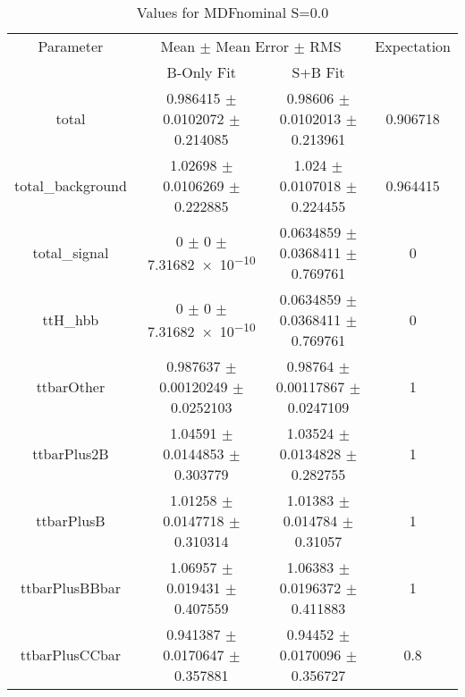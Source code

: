 \begin{table}
\centering
\caption{Values for MDFnominal S=0.0}
\begin{tabular}{cccc}
\toprule
Parameter & \multicolumn{2}{c}{Mean $\pm$ Mean Error $\pm$ RMS} & Expectation\\
 & B-Only Fit & S+B Fit & \\
\midrule
total & \num{0.986415} $\pm$ \num{0.0102072} $\pm$ \num{0.214085} & \num{0.98606} $\pm$ \num{0.0102013} $\pm$ \num{0.213961} & \num{0.906718}\\
total\_background & \num{1.02698} $\pm$ \num{0.0106269} $\pm$ \num{0.222885} & \num{1.024} $\pm$ \num{0.0107018} $\pm$ \num{0.224455} & \num{0.964415}\\
total\_signal & \num{0} $\pm$ \num{0} $\pm$ \num{7.31682e-10} & \num{0.0634859} $\pm$ \num{0.0368411} $\pm$ \num{0.769761} & \num{0}\\
ttH\_hbb & \num{0} $\pm$ \num{0} $\pm$ \num{7.31682e-10} & \num{0.0634859} $\pm$ \num{0.0368411} $\pm$ \num{0.769761} & \num{0}\\
ttbarOther & \num{0.987637} $\pm$ \num{0.00120249} $\pm$ \num{0.0252103} & \num{0.98764} $\pm$ \num{0.00117867} $\pm$ \num{0.0247109} & \num{1}\\
ttbarPlus2B & \num{1.04591} $\pm$ \num{0.0144853} $\pm$ \num{0.303779} & \num{1.03524} $\pm$ \num{0.0134828} $\pm$ \num{0.282755} & \num{1}\\
ttbarPlusB & \num{1.01258} $\pm$ \num{0.0147718} $\pm$ \num{0.310314} & \num{1.01383} $\pm$ \num{0.014784} $\pm$ \num{0.31057} & \num{1}\\
ttbarPlusBBbar & \num{1.06957} $\pm$ \num{0.019431} $\pm$ \num{0.407559} & \num{1.06383} $\pm$ \num{0.0196372} $\pm$ \num{0.411883} & \num{1}\\
ttbarPlusCCbar & \num{0.941387} $\pm$ \num{0.0170647} $\pm$ \num{0.357881} & \num{0.94452} $\pm$ \num{0.0170096} $\pm$ \num{0.356727} & \num{0.8}\\
\bottomrule
\end{tabular}
\end{table}